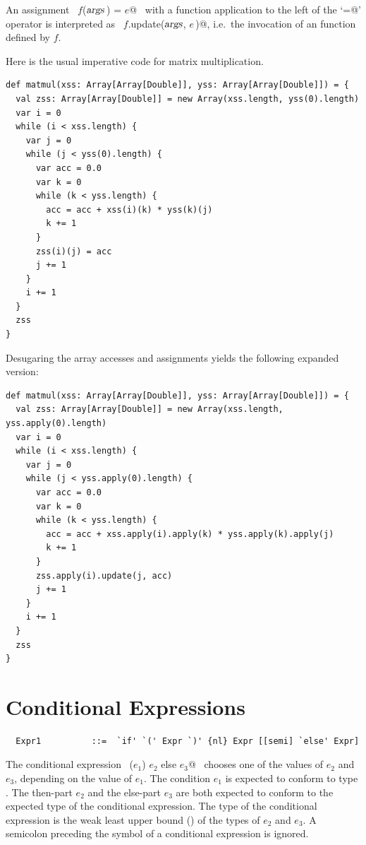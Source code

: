 An assignment ~\lstinline@$f$($\mbox{\sl args}\,$) = $e$@~ with a function application to the
left of the `\lstinline@=@' operator is interpreted as 
~\lstinline@$f.$update($\mbox{\sl args}$, $e\,$)@, i.e.\
the invocation of an  function defined by $f$.

\example \label{ex:imp-mat-mul}
Here is the usual imperative code for matrix multiplication.

\begin{lstlisting}
def matmul(xss: Array[Array[Double]], yss: Array[Array[Double]]) = {
  val zss: Array[Array[Double]] = new Array(xss.length, yss(0).length) 
  var i = 0 
  while (i < xss.length) {
    var j = 0 
    while (j < yss(0).length) {
      var acc = 0.0 
      var k = 0 
      while (k < yss.length) {
        acc = acc + xss(i)(k) * yss(k)(j) 
        k += 1
      }
      zss(i)(j) = acc 
      j += 1
    }
    i += 1
  }
  zss
}
\end{lstlisting}
Desugaring the array accesses and assignments yields the following
expanded version:
\begin{lstlisting}
def matmul(xss: Array[Array[Double]], yss: Array[Array[Double]]) = {
  val zss: Array[Array[Double]] = new Array(xss.length, yss.apply(0).length) 
  var i = 0 
  while (i < xss.length) {
    var j = 0 
    while (j < yss.apply(0).length) {
      var acc = 0.0 
      var k = 0 
      while (k < yss.length) {
        acc = acc + xss.apply(i).apply(k) * yss.apply(k).apply(j) 
        k += 1
      }
      zss.apply(i).update(j, acc) 
      j += 1
    }
    i += 1
  }
  zss
}
\end{lstlisting}

\section{Conditional Expressions}\label{sec:cond}

\syntax\begin{lstlisting}
  Expr1          ::=  `if' `(' Expr `)' {nl} Expr [[semi] `else' Expr]
\end{lstlisting}

The conditional expression ~\lstinline@if ($e_1$) $e_2$ else $e_3$@~ chooses
one of the values of $e_2$ and $e_3$, depending on the
value of $e_1$. The condition $e_1$ is expected to
conform to type .  The then-part $e_2$ and the
else-part $e_3$ are both expected to conform to the expected
type of the conditional expression. The type of the conditional
expression is the weak least upper bound ()
of the types of $e_2$ and
$e_3$.  A semicolon preceding the  symbol of a
conditional expression is ignored.

